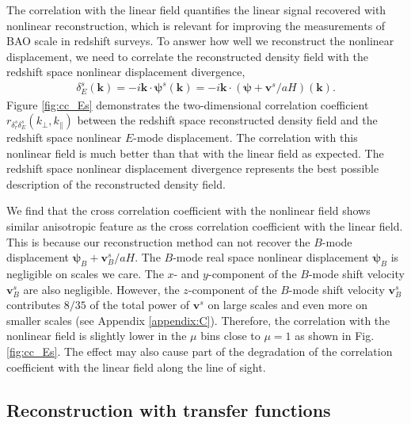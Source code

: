 \documentclass[aps,prd,twocolumn,superscriptaddress,groupedaddress,nofootinbib,amsfont]{revtex4}  %
\newcommand{\bea}{\begin{eqnarray}}
\newcommand{\eea}{\end{eqnarray}}
\newcommand{\bmp}{\bm{\psi}}
\newcommand{\bmv}{\bm{v}}
\newcommand{\bmk}{\bm{k}}
\begin{document}
The correlation with the linear field quantifies the linear signal recovered
with nonlinear reconstruction, which is relevant for improving the measurements
of BAO scale in redshift surveys. 
To answer how well we reconstruct the nonlinear displacement, we need to
correlate the reconstructed density field with the redshift space nonlinear 
displacement divergence,
\bea
\delta_E^s(\bmk)=-i\bmk\cdot\bmp^s(\bmk)=-i\bmk\cdot(\bmp+\bmv^s/aH)(\bmk).
\eea
Figure \ref{fig:cc_Es} demonstrates the two-dimensional correlation coefficient 
$r_{\delta_r^s\delta_E^s}(k_\perp,k_\parallel)$ between the redshift space reconstructed density field and the redshift space nonlinear $E$-mode displacement.
The correlation with this nonlinear field is much better than that with the 
linear field as expected.
The redshift space nonlinear displacement divergence represents the best 
possible description of the reconstructed density field.

We find that the cross correlation coefficient with the nonlinear field shows 
similar anisotropic feature as the cross correlation coefficient with the 
linear field. This is because our reconstruction method can not recover the 
$B$-mode displacement $\bmp_B+\bmv_B^s/aH$. The $B$-mode real space nonlinear 
displacement $\bmp_B$ is negligible on scales we care. The $x$- and $y$-component of the $B$-mode shift velocity $\bmv^s_B$ are also negligible.
However, the $z$-component of the $B$-mode shift velocity $\bmv^s_B$ contributes
$8/35$ of the total power of $\bmv^s$ on large scales and even more on smaller
scales (see Appendix \ref{appendix:C}). 
Therefore, the correlation with the nonlinear field is slightly lower in the 
$\mu$ bins close to $\mu=1$ as shown in Fig. \ref{fig:cc_Es}.
The effect may also cause part of the degradation of the correlation coefficient
with the linear field along the line of sight.


\subsection{Reconstruction with transfer functions}
\end{document}
